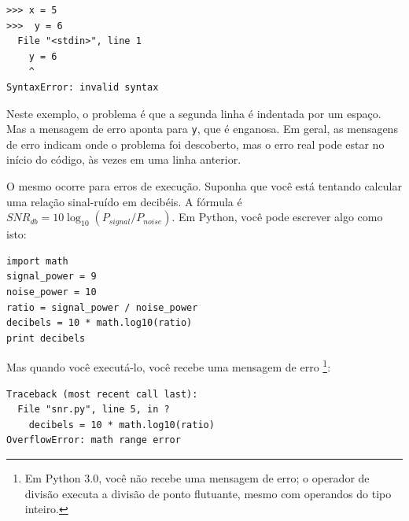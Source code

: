 {\beforeverb
\begin{verbatim}
>>> x = 5
>>>  y = 6
  File "<stdin>", line 1
    y = 6
    ^
SyntaxError: invalid syntax
\end{verbatim}
\afterverb
%
Neste exemplo, o problema é que a segunda linha é indentada por
um espaço. Mas a mensagem de erro aponta para {\tt y}, que é
enganosa. Em geral, as mensagens de erro indicam onde o problema foi
descoberto, mas o erro real pode estar no início do código,
às vezes em uma linha anterior.



O mesmo ocorre para erros de execução. Suponha que você está tentando
calcular uma relação sinal-ruído em decibéis. A fórmula
é $SNR_{db} = 10 \log_{10} (P_{signal} / P_{noise})$. Em Python,
você pode escrever algo como isto:


\beforeverb
\begin{verbatim}
import math
signal_power = 9
noise_power = 10
ratio = signal_power / noise_power
decibels = 10 * math.log10(ratio)
print decibels
\end{verbatim}
\afterverb
%
Mas quando você executá-lo, você recebe uma mensagem de erro \footnote{Em Python 3.0,
   você não recebe uma mensagem de erro; o operador de divisão executa a
   divisão de ponto flutuante, mesmo com operandos do tipo inteiro.}:



\beforeverb
\begin{verbatim}
Traceback (most recent call last):
  File "snr.py", line 5, in ?
    decibels = 10 * math.log10(ratio)
OverflowError: math range error
\end{verbatim}
\afterverb
%

}
